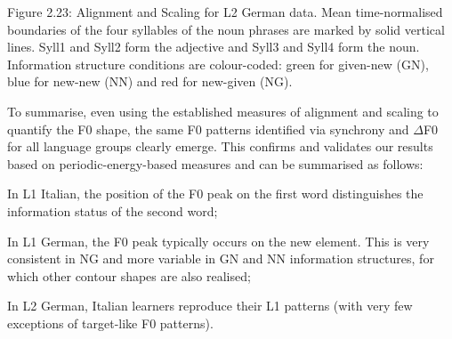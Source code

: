 \begin{stylecaption}
  [Warning: Image ignored] %
 
\end{stylecaption}

\begin{stylecaption}
Figure 2.23: Alignment and Scaling for L2 German data. Mean time-normalised boundaries of the four syllables of the noun phrases are marked by solid vertical lines. Syll1 and Syll2 form the adjective and Syll3 and Syll4 form the noun. Information structure conditions are colour-coded: green for given-new (GN), blue for new-new (NN) and red for new-given (NG).
\end{stylecaption}

\begin{styleStandard}
To summarise, even using the established measures of alignment and scaling to quantify the F0 shape, the same F0 patterns identified via synchrony and ${\Delta}$F0 for all language groups clearly emerge. This confirms and validates our results based on periodic-energy-based measures and can be summarised as follows:
\end{styleStandard}

\begin{listWWNumiiileveli}
\item 
\begin{stylelsBulletList}
In L1 Italian, the position of the F0 peak on the first word distinguishes the information status of the second word;
\end{stylelsBulletList}
\item 
\begin{stylelsBulletList}
In L1 German, the F0 peak typically occurs on the new element. This is very consistent in NG and more variable in GN and NN information structures, for which other contour shapes are also realised;
\end{stylelsBulletList}
\item 
\begin{stylelsBulletList}
In L2 German, Italian learners reproduce their L1 patterns (with very few exceptions of target-like F0 patterns).
\end{stylelsBulletList}
\end{listWWNumiiileveli}
